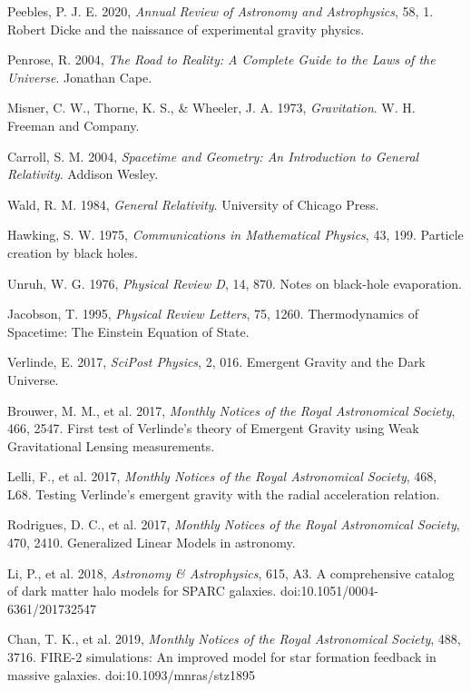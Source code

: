\documentclass[fleqn,usenatbib]{mnras}
\begin{document}
\begin{thebibliography}{99}
 Peebles, P. J. E. 2020, \textit{Annual Review of Astronomy and Astrophysics}, 58, 1. Robert Dicke and the naissance of experimental gravity physics.

 Penrose, R. 2004, \textit{The Road to Reality: A Complete Guide to the Laws of the Universe}. Jonathan Cape.

 Misner, C. W., Thorne, K. S., \& Wheeler, J. A. 1973, \textit{Gravitation}. W. H. Freeman and Company.

 Carroll, S. M. 2004, \textit{Spacetime and Geometry: An Introduction to General Relativity}. Addison Wesley.

 Wald, R. M. 1984, \textit{General Relativity}. University of Chicago Press.

 Hawking, S. W. 1975, \textit{Communications in Mathematical Physics}, 43, 199. Particle creation by black holes.

 Unruh, W. G. 1976, \textit{Physical Review D}, 14, 870. Notes on black-hole evaporation.

 Jacobson, T. 1995, \textit{Physical Review Letters}, 75, 1260. Thermodynamics of Spacetime: The Einstein Equation of State.

 Verlinde, E. 2017, \textit{SciPost Physics}, 2, 016. Emergent Gravity and the Dark Universe.

 Brouwer, M. M., et al. 2017, \textit{Monthly Notices of the Royal Astronomical Society}, 466, 2547. First test of Verlinde's theory of Emergent Gravity using Weak Gravitational Lensing measurements.

 Lelli, F., et al. 2017, \textit{Monthly Notices of the Royal Astronomical Society}, 468, L68. Testing Verlinde's emergent gravity with the radial acceleration relation.

 Rodrigues, D. C., et al. 2017, \textit{Monthly Notices of the Royal Astronomical Society}, 470, 2410. Generalized Linear Models in astronomy.

 Li, P., et al. 2018, \textit{Astronomy \& Astrophysics}, 615, A3. A comprehensive catalog of dark matter halo models for SPARC galaxies. doi:10.1051/0004-6361/201732547

 Chan, T. K., et al. 2019, \textit{Monthly Notices of the Royal Astronomical Society}, 488, 3716. FIRE-2 simulations: An improved model for star formation feedback in massive galaxies. doi:10.1093/mnras/stz1895


\end{thebibliography}
\end{document}
